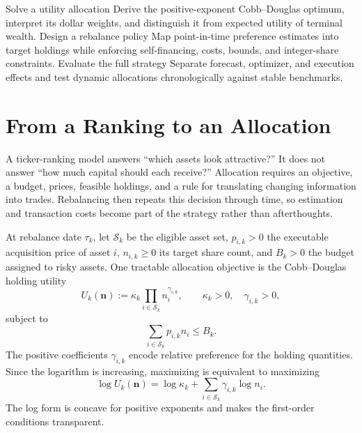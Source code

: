 \documentclass[11pt]{article}
\begin{document}

\learningobjectives
  {Solve a utility allocation}
  {Derive the positive-exponent Cobb--Douglas optimum, interpret its dollar weights, and distinguish it from expected utility of terminal wealth.}
  {Design a rebalance policy}
  {Map point-in-time preference estimates into target holdings while enforcing self-financing, costs, bounds, and integer-share constraints.}
  {Evaluate the full strategy}
  {Separate forecast, optimizer, and execution effects and test dynamic allocations chronologically against stable benchmarks.}

\section{From a Ranking to an Allocation}

A ticker-ranking model answers ``which assets look attractive?'' It does not answer ``how much capital should each receive?'' Allocation requires an objective, a budget, prices, feasible holdings, and a rule for translating changing information into trades. Rebalancing then repeats this decision through time, so estimation and transaction costs become part of the strategy rather than afterthoughts.

At rebalance date $\tau_k$, let $\mathcal S_k$ be the eligible asset set, $p_{i,k}>0$ the executable acquisition price of asset $i$, $n_{i,k}\geq 0$ its target share count, and $B_k>0$ the budget assigned to risky assets. One tractable allocation objective is the Cobb--Douglas holding utility
\begin{equation}
  \label{eq:cobb-douglas}
  U_k(\mathbf n):=\kappa_k\prod_{i\in\mathcal S_k}n_i^{\gamma_{i,k}},
  \qquad \kappa_k>0,\quad \gamma_{i,k}>0,
\end{equation}
subject to
\begin{equation}
  \label{eq:budget}
  \sum_{i\in\mathcal S_k}p_{i,k}n_i\leq B_k.
\end{equation}
The positive coefficients $\gamma_{i,k}$ encode relative preference for the holding quantities. Since the logarithm is increasing, maximizing  is equivalent to maximizing
\begin{equation}
  \label{eq:log-utility}
  \log U_k(\mathbf n)=\log\kappa_k+
  \sum_{i\in\mathcal S_k}\gamma_{i,k}\log n_i.
\end{equation}
The log form is concave for positive exponents and makes the first-order conditions transparent.
\end{document}
